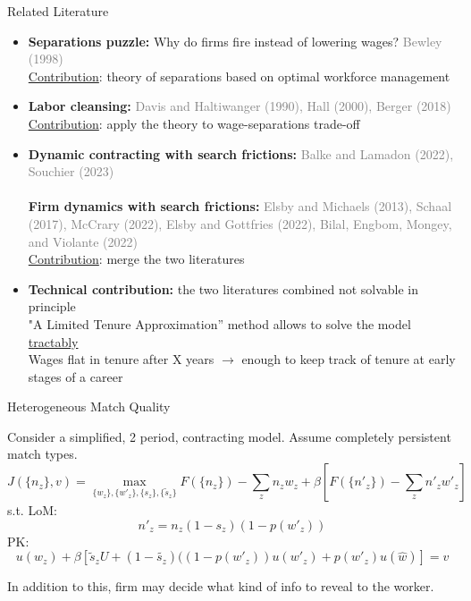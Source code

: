 \documentclass[9pt,aspectratio=169]{beamer} %
\begin{document}
\begin{frame}[noframenumbering]{Related Literature}
\hypertarget{LTA}{}
\begin{itemize}
    \item \textbf{Separations puzzle:} Why do firms fire instead of lowering wages? \textcolor{gray}{Bewley (1998)} \\
    \underline{Contribution}: theory of separations based on optimal workforce management
\end{itemize}
\midskip
\begin{itemize}
    \item \textbf{Labor cleansing:} \textcolor{gray}{Davis and Haltiwanger (1990), Hall (2000), Berger (2018)} \\
     \underline{Contribution}: apply the theory to wage-separations trade-off
\end{itemize}
\pause
\bigskip
\begin{itemize}
    \item \textbf{Dynamic contracting with search frictions:} \textcolor{gray}{Balke and Lamadon (2022), Souchier (2023)} \\
\\
    \textbf{Firm dynamics with search frictions:}
    \textcolor{gray}{Elsby and Michaels (2013), Schaal (2017), McCrary (2022), Elsby and Gottfries (2022), Bilal, Engbom, Mongey, and Violante (2022)}  \\

   \underline{Contribution}: merge the two literatures
\\
    
\end{itemize}
\pause
    \bigskip
    \begin{itemize}
        \item \textbf{Technical contribution:} the two literatures combined not solvable in principle \\
        "A Limited Tenure Approximation” method allows to solve the model \underline{tractably} \\
 Wages flat in tenure after X years $\rightarrow$ enough to keep track of tenure at early stages of a career \hyperlink{Wage growth}{}
    \end{itemize}
\end{frame}

\begin{frame}[noframenumbering]{Heterogeneous Match Quality}
\hypertarget{HMQ Assumption}{}

Consider a simplified, 2 period, contracting model. Assume completely persistent match types. \\
\[J(\{n_z\},v) = \max_{\{w_z\},\{w'_z\},\{s_z\},\{\tilde{s}_z\}} F(\{n_z\}) - \sum_{z} n_z w_z + \beta [F(\{n'_z\})-\sum_z n'_z w'_z]\]
s.t. LoM: \[n'_z = n_z (1-s_z)(1-p(w'_z))\] 
PK: \[u(w_z)+\beta[\tilde{s}_zU+(1-\tilde{s_z})((1-p(w'_z))u(w'_z)+p(w'_z)u(\hat{w})]=v\] 

In addition to this, firm may decide what kind of info to reveal to the worker.
\vspace{10pt}
\end{frame}
\end{document}
